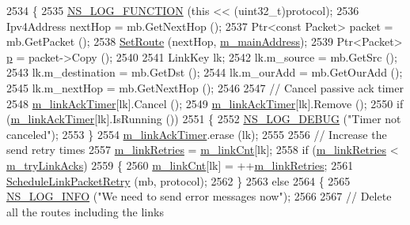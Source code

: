 \begin{DoxyCode}
2534 \{
2535   \hyperlink{log-macros-disabled_8h_a90b90d5bad1f39cb1b64923ea94c0761}{NS\_LOG\_FUNCTION} (\textcolor{keyword}{this} << (uint32\_t)protocol);
2536   Ipv4Address nextHop = mb.GetNextHop ();
2537   Ptr<const Packet> packet = mb.GetPacket ();
2538   \hyperlink{classns3_1_1dsr_1_1DsrRouting_a8a726fb52558a1a8172a5bd5b8cdb072}{SetRoute} (nextHop, \hyperlink{classns3_1_1dsr_1_1DsrRouting_a73182b5edee2d8460f28855e058fc9a0}{m\_mainAddress});
2539   Ptr<Packet> \hyperlink{lte__link__budget_8m_ac9de518908a968428863f829398a4e62}{p} = packet->Copy ();
2540 
2541   LinkKey lk;
2542   lk.m\_source = mb.GetSrc ();
2543   lk.m\_destination = mb.GetDst ();
2544   lk.m\_ourAdd = mb.GetOurAdd ();
2545   lk.m\_nextHop = mb.GetNextHop ();
2546 
2547   \textcolor{comment}{// Cancel passive ack timer}
2548   \hyperlink{classns3_1_1dsr_1_1DsrRouting_ad532172035dbd4b038de0e94f4ce5ff6}{m\_linkAckTimer}[lk].Cancel ();
2549   \hyperlink{classns3_1_1dsr_1_1DsrRouting_ad532172035dbd4b038de0e94f4ce5ff6}{m\_linkAckTimer}[lk].Remove ();
2550   \textcolor{keywordflow}{if} (\hyperlink{classns3_1_1dsr_1_1DsrRouting_ad532172035dbd4b038de0e94f4ce5ff6}{m\_linkAckTimer}[lk].IsRunning ())
2551     \{
2552       \hyperlink{group__logging_ga413f1886406d49f59a6a0a89b77b4d0a}{NS\_LOG\_DEBUG} (\textcolor{stringliteral}{"Timer not canceled"});
2553     \}
2554   \hyperlink{classns3_1_1dsr_1_1DsrRouting_ad532172035dbd4b038de0e94f4ce5ff6}{m\_linkAckTimer}.erase (lk);
2555 
2556   \textcolor{comment}{// Increase the send retry times}
2557   \hyperlink{classns3_1_1dsr_1_1DsrRouting_a78b9a7405d3c905f57fa5aba63984d26}{m\_linkRetries} = \hyperlink{classns3_1_1dsr_1_1DsrRouting_a85ba159639f9bc13b3d8890458128a79}{m\_linkCnt}[lk];
2558   \textcolor{keywordflow}{if} (\hyperlink{classns3_1_1dsr_1_1DsrRouting_a78b9a7405d3c905f57fa5aba63984d26}{m\_linkRetries} < \hyperlink{classns3_1_1dsr_1_1DsrRouting_acecdd106e259c448bcfa6a6cef901658}{m\_tryLinkAcks})
2559     \{
2560       \hyperlink{classns3_1_1dsr_1_1DsrRouting_a85ba159639f9bc13b3d8890458128a79}{m\_linkCnt}[lk] = ++\hyperlink{classns3_1_1dsr_1_1DsrRouting_a78b9a7405d3c905f57fa5aba63984d26}{m\_linkRetries};
2561       \hyperlink{classns3_1_1dsr_1_1DsrRouting_a947d831bc0964240b1a41b3a09832eff}{ScheduleLinkPacketRetry} (mb, protocol);
2562     \}
2563   \textcolor{keywordflow}{else}
2564     \{
2565       \hyperlink{group__logging_gafbd73ee2cf9f26b319f49086d8e860fb}{NS\_LOG\_INFO} (\textcolor{stringliteral}{"We need to send error messages now"});
2566 
2567       \textcolor{comment}{// Delete all the routes including the links}

\end{DoxyCode}
